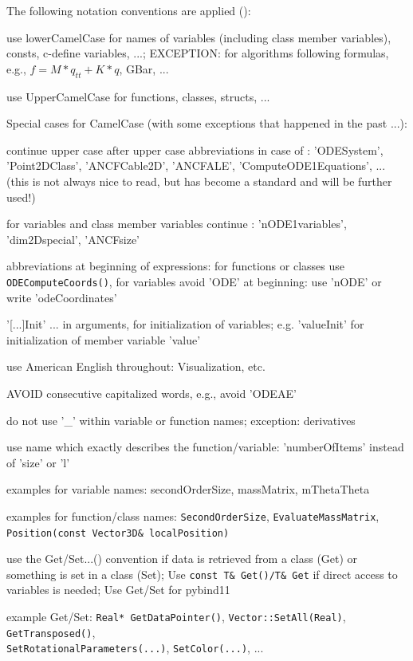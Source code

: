 %
The following notation conventions are applied ():
\bi
    \item use lowerCamelCase for names of variables (including class member variables), consts, c-define variables, ...; EXCEPTION: for algorithms following formulas, e.g., $f = M*q_{tt} + K*q$, GBar, ...
    \item use UpperCamelCase for functions, classes, structs, ...
    \item Special cases for CamelCase (with some exceptions that happened in the past ...): 
    \bi
    \item continue upper case after upper case abbreviations in case of : 'ODESystem', 'Point2DClass', 'ANCFCable2D', 'ANCFALE', 'ComputeODE1Equations', ... (this is not always nice to read, but has become a standard and will be further used!) 
    \item for variables and class member variables continue : 'nODE1variables', 'dim2Dspecial', 'ANCFsize'
    \item abbreviations at beginning of expressions: for functions or classes use \texttt{ODEComputeCoords()}, for variables avoid 'ODE' at beginning: use 'nODE' or write 'odeCoordinates'
    \ei
    \item '[...]Init' ... in arguments, for initialization of variables; e.g. 'valueInit' for initialization of member variable 'value'
    \item use American English throughout: Visualization, etc.
    \item AVOID consecutive capitalized words, e.g., avoid 'ODEAE'
    \item do not use '\_' within variable or function names; exception: derivatives
    \item use name which exactly describes the function/variable: 'numberOfItems' instead of 'size' or 'l'
    \item examples for variable names: secondOrderSize, massMatrix, mThetaTheta
    \item examples for function/class names: \texttt{SecondOrderSize}, \texttt{EvaluateMassMatrix}, \texttt{Position(const Vector3D\& localPosition)}
    \item use the Get/Set...() convention if data is retrieved from a class (Get) or something is set in a class (Set); Use \texttt{const T\& Get()/T\& Get} if direct access to variables is needed; Use Get/Set for pybind11
    \item example Get/Set: \texttt{Real* GetDataPointer()}, \texttt{Vector::SetAll(Real)}, \texttt{GetTransposed()}, \\ \texttt{SetRotationalParameters(...)}, \texttt{SetColor(...)}, ...
